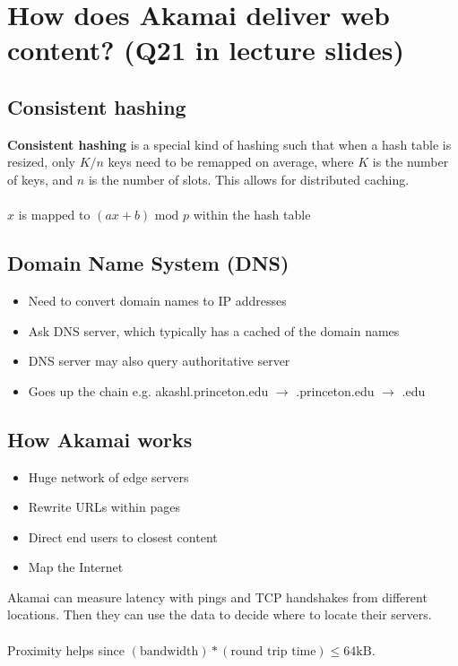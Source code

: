 \documentclass{article}
\begin{document}
\section{How does Akamai deliver web content? (Q21 in lecture slides)}

\subsection{Consistent hashing}

\textbf{Consistent hashing} is a special kind of hashing such that when a hash table is resized, only $K/n$ keys need to be remapped on average, where $K$ is the number of keys, and $n$ is the number of slots. This allows for distributed caching. \\
\\
$x$ is mapped to $(ax + b) \text{ mod } p$ within the hash table

\subsection{Domain Name System (DNS)}

\begin{itemize}
\item Need to convert domain names to IP addresses
\item Ask DNS server, which typically has a cached of the domain names
\item DNS server may also query authoritative server
\item Goes up the chain e.g. akashl.princeton.edu $\rightarrow$ .princeton.edu $\rightarrow$ .edu
\end{itemize}

\subsection{How Akamai works}

\begin{itemize}
\item Huge network of edge servers
\item Rewrite URLs within pages
\item Direct end users to closest content
\item Map the Internet
\end{itemize}
Akamai can measure latency with pings and TCP handshakes from different locations. Then they can use the data to decide where to locate their servers. \\
\\
Proximity helps since $(\text{bandwidth})*(\text{round trip time}) \leq 64 \text{kB}$.
\end{document}
